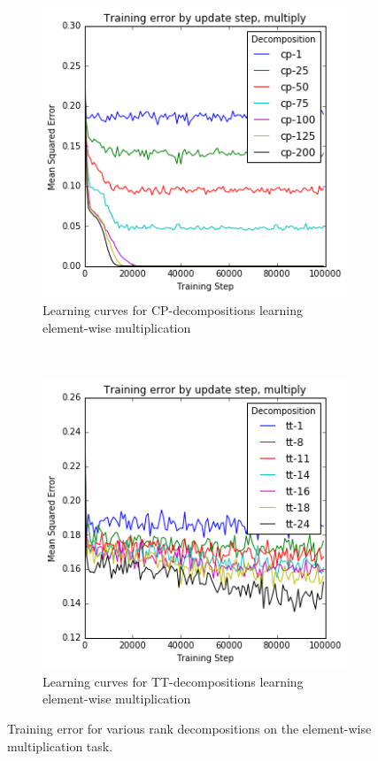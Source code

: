 \begin{figure}
	\begin{subfigure}[t]{0.45\textwidth}
		\includegraphics[width=\textwidth]{tensors/multiply-cp-mom}
		\caption{Learning curves for CP-decompositions learning element-wise multiplication}
	\end{subfigure}
	~
	\begin{subfigure}[t]{0.45\textwidth}
		\includegraphics[width=\textwidth]{tensors/multiply-tt-mom}
		\caption{Learning curves for TT-decompositions learning element-wise multiplication}
	\end{subfigure}
	\caption{Training error for various rank decompositions on the element-wise multiplication
	task.}
	\label{fig:multiply-ff}
\end{figure}

